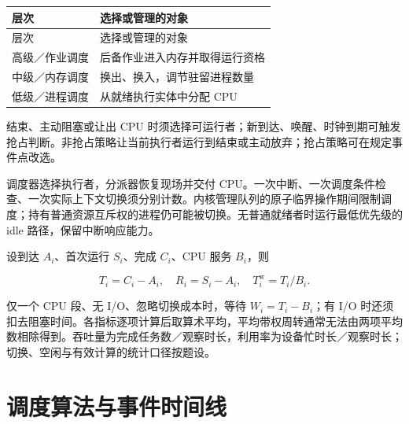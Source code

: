 \par\smallskip
{\fontsize{9.3}{12}\selectfont\setlength{\tabcolsep}{2.5pt}\setlength{\LTleft}{0pt}\setlength{\LTright}{0pt}
\begin{longtable}{@{}>{\raggedright\arraybackslash}p{}>{\raggedright\arraybackslash}p{}@{}}
\toprule
层次 & 选择或管理的对象 \\

\midrule\endfirsthead\toprule
层次 & 选择或管理的对象 \\

\midrule\endhead\bottomrule\endfoot
高级／作业调度 & 后备作业进入内存并取得运行资格 \\

中级／内存调度 & 换出、换入，调节驻留进程数量 \\

低级／进程调度 & 从就绪执行实体中分配 CPU \\

\end{longtable}}
\par\smallskip

结束、主动阻塞或让出 CPU 时须选择可运行者；新到达、唤醒、时钟到期可触发抢占判断。非抢占策略让当前执行者运行到结束或主动放弃；抢占策略可在规定事件点改选。

调度器选择执行者，分派器恢复现场并交付 CPU。一次中断、一次调度条件检查、一次实际上下文切换须分别计数。内核管理队列的原子临界操作期间限制调度；持有普通资源互斥权的进程仍可能被切换。无普通就绪者时运行最低优先级的 idle 路径，保留中断响应能力。

设到达 \(A_i\)、首次运行 \(S_i\)、完成 \(C_i\)、CPU 服务 \(B_i\)，则

\[T_i=C_i-A_i,\quad R_i=S_i-A_i,\quad T_i^{\mathrm w}=T_i/B_i.\]

仅一个 CPU 段、无 I/O、忽略切换成本时，等待 \(W_i=T_i-B_i\)；有 I/O 时还须扣去阻塞时间。各指标逐项计算后取算术平均，平均带权周转通常无法由两项平均数相除得到。吞吐量为完成任务数／观察时长，利用率为设备忙时长／观察时长；切换、空闲与有效计算的统计口径按题设。

\section{调度算法与事件时间线}\label{OS02-scheduling-algorithms}

